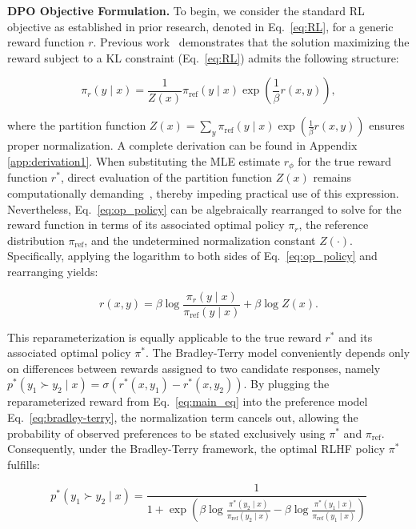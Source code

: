 \textbf{DPO Objective Formulation.} To begin, we consider the standard RL objective as established in prior research, denoted in Eq.~\ref{eq:RL}, for a generic reward function $r$. Previous work~\citep{peters2007reinforcement, peng2019advantage, korbak2022reinforcement, go2023aligning} demonstrates that the solution maximizing the reward subject to a KL constraint (Eq.~\ref{eq:RL}) admits the following structure:

\begin{equation}\label{eq:op_policy}
    \pi_r(y\mid x) = \frac{1}{Z(x)}\pi_\text{ref}(y\mid x)\exp\left(\frac{1}{\beta}r(x, y)\right),
\end{equation}

where the partition function $Z(x) =\sum_{y}\pi_\text{ref}(y\mid x)\exp\left(\frac{1}{\beta}r(x, y)\right)$ ensures proper normalization. A complete derivation can be found in Appendix \ref{app:derivation1}. When substituting the MLE estimate $r_{\phi}$ for the true reward function $r^*$, direct evaluation of the partition function $Z(x)$ remains computationally demanding~\citep{korbak2022reinforcement, go2023aligning}, thereby impeding practical use of this expression. Nevertheless, Eq.~\ref{eq:op_policy} can be algebraically rearranged to solve for the reward function in terms of its associated optimal policy $\pi_r$, the reference distribution $\pi_\text{ref}$, and the undetermined normalization constant $Z(\cdot)$. Specifically, applying the logarithm to both sides of Eq.~\ref{eq:op_policy} and rearranging yields:

\begin{equation}\label{eq:main_eq}
    r(x,y) =\beta \log \frac{\pi_r(y\mid x)}{\pi_\text{ref}(y\mid x)} + \beta \log Z(x).
\end{equation}

This reparameterization is equally applicable to the true reward $r^*$ and its associated optimal policy $\pi^*$. The Bradley-Terry model conveniently depends only on differences between rewards assigned to two candidate responses, namely ${p^*(y_1 \succ y_2 \mid x) = \sigma(r^*(x, y_1) - r^*(x, y_2))}$. By plugging the reparameterized reward from Eq.~\ref{eq:main_eq} into the preference model Eq.~\ref{eq:bradley-terry}, the normalization term cancels out, allowing the probability of observed preferences to be stated exclusively using $\pi^*$ and $\pi_\text{ref}$. Consequently, under the Bradley-Terry framework, the optimal RLHF policy $\pi^*$ fulfills:

\begin{equation}\label{eq:objective}
    p^*(y_1\succ y_2 \mid x)=\frac{1}{1 + \exp\left(\beta \log \frac{\pi^*(y_2\mid x)}{\pi_\text{ref}(y_2\mid x)} - \beta \log \frac{\pi^*(y_1\mid x)}{\pi_\text{ref}(y_1\mid x)}\right)}
\end{equation}

